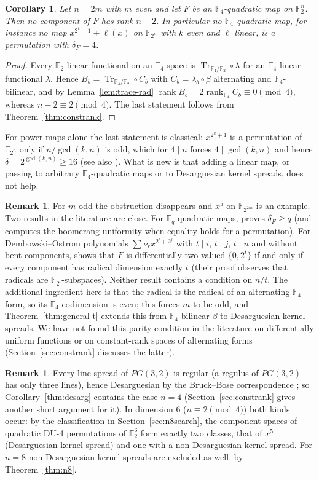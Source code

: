 \documentclass[11pt]{article}
\newtheorem{corollary}[theorem]{Corollary}
\theoremstyle{definition}
\newtheorem{remark}[theorem]{Remark}
\newcommand{\F}{\mathbb{F}}
\DeclareMathOperator{\Tr}{Tr}
\DeclareMathOperator{\rk}{rank}
\begin{document}
\begin{corollary}\label{thm:f4}
Let $n=2m$ with $m$ even and let $F$ be an $\F_4$-quadratic map on $\F_2^n$. Then no component of
$F$ has rank $n-2$. In particular no $\F_4$-quadratic map, for instance no map
$x^{2^k+1}+\ell(x)$ on $\F_{2^n}$ with $k$ even and $\ell$ linear, is a permutation with
$\delta_F=4$.
\end{corollary}
\begin{proof}
Every $\F_2$-linear functional on an $\F_4$-space is $\Tr_{\F_4/\F_2}\circ\lambda$ for an
$\F_4$-linear functional $\lambda$. Hence $B_b=\Tr_{\F_4/\F_2}\circ C_b$ with $C_b=\lambda_b\circ\beta$
alternating and $\F_4$-bilinear, and by Lemma~\ref{lem:trace-rad}
$\rk B_b=2\rk_{\F_4}C_b\equiv0\pmod4$, whereas $n-2\equiv2\pmod4$. The last statement follows
from Theorem~\ref{thm:constrank}.
\end{proof}
For power maps alone the last statement is classical: $x^{2^k+1}$ is a permutation of
$\F_{2^n}$ only if $n/\gcd(k,n)$ is odd, which for $4\mid n$ forces $4\mid\gcd(k,n)$ and hence
$\delta=2^{\gcd(k,n)}\ge16$ \cite{Gold68,Nyb93} (see also \cite{ACPBSN25}). What is new is that
adding a linear map, or passing to arbitrary $\F_4$-quadratic maps or to Desarguesian kernel
spreads, does not help.
\begin{remark}
For $m$ odd the obstruction disappears and $x^{5}$ on $\F_{2^{2m}}$ is an example. Two results
in the literature are close. For $\F_q$-quadratic maps, \cite[Theorem~5]{MTX19} proves
$\delta_F\ge q$ (and computes the boomerang uniformity when equality holds for a permutation).
For Dembowski--Ostrom polynomials $\sum\nu_r x^{2^i+2^j}$ with $t\mid i$, $t\mid j$, $t\mid n$
and without bent components, \cite[Theorem~8]{CP19} shows that $F$ is differentially two-valued
$\{0,2^t\}$ if and only if every component has radical dimension exactly $t$ (their proof
observes that radicals are $\F_{2^t}$-subspaces). Neither result contains a condition on $n/t$.
The additional ingredient here is that the radical is the radical of an alternating
$\F_4$-form, so its $\F_4$-codimension is even; this forces $m$ to be odd, and
Theorem~\ref{thm:general-t} extends this from $\F_4$-bilinear $\beta$ to Desarguesian kernel
spreads. We have not found this parity condition in the literature on differentially uniform
functions or on constant-rank spaces of alternating forms (Section~\ref{sec:constrank} discusses
the latter).
\end{remark}
\begin{remark}
Every line spread of $PG(3,2)$ is regular (a regulus of $PG(3,2)$ has only three lines), hence
Desarguesian by the Bruck--Bose correspondence \cite{BB64,Hir85}; so Corollary~\ref{thm:desarg}
contains the case $n=4$ (Section~\ref{sec:constrank} gives another short argument for it). In dimension $6$ ($n\equiv 2\pmod 4$) both kinds occur: by
the classification in Section~\ref{sec:n8search}, the component spaces of quadratic DU-4
permutations of $\F_2^6$ form exactly two classes, that of $x^5$ (Desarguesian kernel spread) and
one with a non-Desarguesian kernel spread. For $n=8$ non-Desarguesian kernel spreads are
excluded as well, by Theorem~\ref{thm:n8}.
\end{remark}
\end{document}
